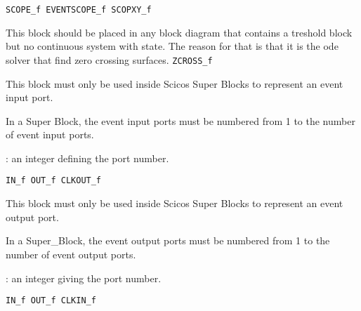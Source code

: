 {\verb?SCOPE_f EVENTSCOPE_f SCOPXY_f?} \pageref{SCOPEfEVENTSCOPEfSCOPXYf}





%
%


\label{CLINDUMMYf}

This block should be placed in any block diagram that contains a
treshold block but no continuous system with state. The reason 
for that is that it is the ode solver that find zero crossing
surfaces.
{\verb?ZCROSS_f?} \pageref{ZCROSSf}








%
%


\label{CLKINf}

This block must only be used inside Scicos Super Blocks to represent
an event input port. 
\par\noindent
In a Super Block, the event input ports must be numbered from 1 to the
number of event input ports.
\begin{scitem}
\item[{\verb?Port number?}]
: an integer defining the port number.
\end{scitem}%
{\verb?IN_f OUT_f CLKOUT_f?} \pageref{INfOUTfCLKOUTf}
%
%


\label{CLKOUTf}

This block must only be used inside Scicos Super Blocks to represent
an event output port. 
\par\noindent
In a Super\_Block, the event output ports must be numbered from 1 to the
number of event output ports.
\begin{scitem}
\item[{\verb?Port number?}]
: an integer giving the port number.
\end{scitem}%
{\verb?IN_f OUT_f CLKIN_f?} \pageref{INfOUTfCLKINf}

